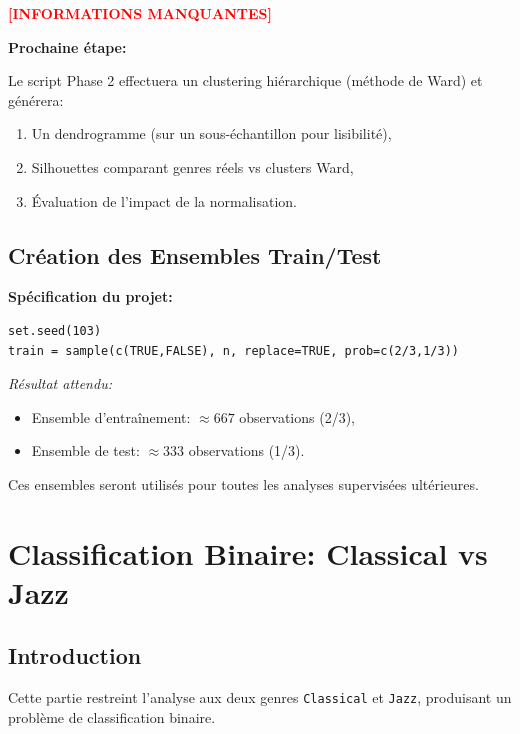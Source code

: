 \documentclass[11pt,a4paper,french]{report}
\begin{document}
\textcolor{red}{\textbf{[INFORMATIONS MANQUANTES]}}

\textbf{Prochaine étape:}

Le script Phase 2 effectuera un clustering hiérarchique (méthode de Ward) et générera:
\begin{enumerate}
    \item Un dendrogramme (sur un sous-échantillon pour lisibilité),
    \item Silhouettes comparant genres réels vs clusters Ward,
    \item Évaluation de l'impact de la normalisation.
\end{enumerate}

\section{Création des Ensembles Train/Test}

\textbf{Spécification du projet:}

\begin{lstlisting}
set.seed(103)
train = sample(c(TRUE,FALSE), n, replace=TRUE, prob=c(2/3,1/3))
\end{lstlisting}

\textit{Résultat attendu:}
\begin{itemize}
    \item Ensemble d'entraînement: $\approx 667$ observations (2/3),
    \item Ensemble de test: $\approx 333$ observations (1/3).
\end{itemize}

Ces ensembles seront utilisés pour toutes les analyses supervisées ultérieures.

\newpage


\chapter{Classification Binaire: Classical vs Jazz}

\section{Introduction}

Cette partie restreint l'analyse aux deux genres \texttt{Classical} et \texttt{Jazz}, produisant un problème de classification binaire.
\end{document}
